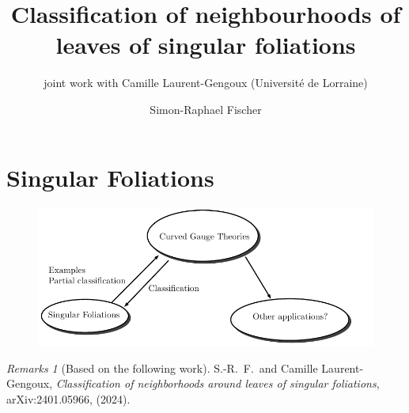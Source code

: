\documentclass[
aspectratio=3218, 
10pt
]{beamer}
\title{Classification of neighbourhoods of leaves of singular foliations}
\subtitle{joint work with Camille Laurent-Gengoux (Université de Lorraine)}
\author{Simon-Raphael Fischer}
\institute{
\begin{figure}
	\centering
		\texttt{[image: Logo\_Uni\_Göttingen\_2022.png]}
	\label{fig:Goettingen}
\end{figure}
}
\date{}
\theoremstyle{plain}
\theoremstyle{remark}
\newtheorem*{remark}{Remarks}
\begin{document}
\begin{frame}
\thispagestyle{empty}
\titlepage
\end{frame} 


\section{Singular Foliations}

{
\begin{frame}
\thispagestyle{empty}
\begin{figure}[htbp]
	\centering
		\includegraphics[width=1\textwidth]{Research circles I.pdf}
\end{figure}
%
\begin{remark}[Based on the following work] 
S.-R.\ F.\ and Camille Laurent-Gengoux, \textit{Classification of neighborhoods around leaves of singular foliations}, arXiv:2401.05966, (2024).
\end{remark}
\end{frame} 
%
}
\end{document}
